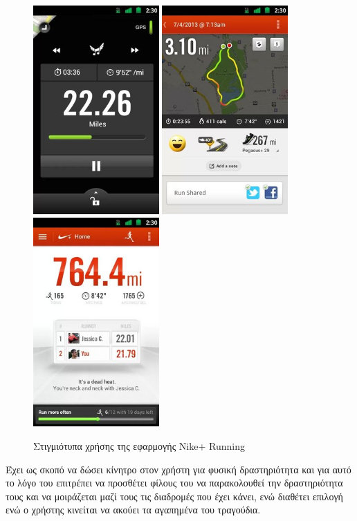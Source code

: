 \documentclass[12pt,twoside,openright]{report}
\begin{document}
\begin{figure}[H]
\includegraphics[height=8cm]{images/nr1}
\hspace{0.4in}
\includegraphics[height=8cm]{images/nr2}
\hspace{0.4in}
\includegraphics[height=8cm]{images/nr3}
\caption{Στιγμιότυπα χρήσης της εφαρμογής \lt Nike+ Running \gt}
\end{figure}Έχει ως σκοπό να δώσει κίνητρο στον χρήστη για φυσική δραστηριότητα και για αυτό το λόγο του επιτρέπει να προσθέτει φίλους του  να παρακολουθεί την δραστηριότητα τους και να μοιράζεται μαζί τους τις διαδρομές που έχει κάνει, ενώ διαθέτει επιλογή ενώ ο χρήστης κινείται να ακούει τα αγαπημένα του τραγούδια. 
\end{document}
